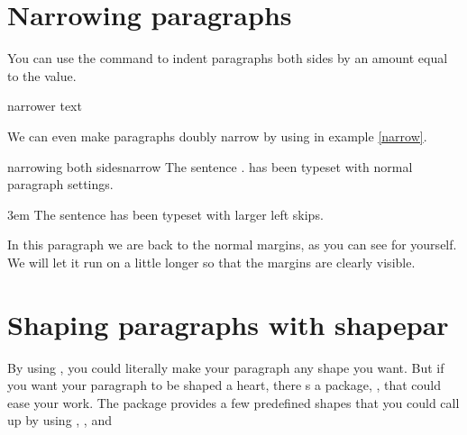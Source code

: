 \section{Narrowing paragraphs}

\begin{macro}{\narrower}
You can use the command  to indent paragraphs both sides by  an amount equal to the
 value.
\end{macro}

\begin{teXXX}
 \def\narrower{%
   \advance\leftskip\parindent
   \advance\rightskip\parindent}
\end{teXXX}

\begin{texexample}{narrower text}{}
\onepar

\narrower\small
\onepar\par
\end{texexample}

We can even make paragraphs doubly narrow by using   in example \ref{narrow}.

\begin{texexample}{narrowing both sides}{narrow}
The sentence \fox. has been typeset with normal paragraph settings.

\parindent3em
\narrower \narrower\small 
The sentence \fox has been typeset with larger left skips.
\medskip
\end{texexample}

\begin{macro}{\leftskip}
\begin{macro}{\rightskip}

In this paragraph we are back to the normal margins, as you can see for yourself. We will let it run on a little longer so that the margins are clearly visible.
\end{macro}
\end{macro}




\section{Shaping paragraphs with shapepar}


By using , you could literally make your paragraph any shape you want.
But if you want your paragraph to be shaped a heart, there s a package, , that
could ease your work. The package provides a few predefined shapes that you could call
up by using , , and 


